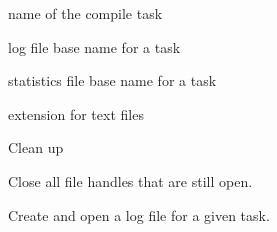 \documentclass[letterpaper,10pt,english]{sphinxmanual}
\begin{document}
\begin{fulllineitems}
\begin{fulllineitems}
\end{fulllineitems}


\begin{fulllineitems}
\label{graf/graf:graf.graf.Graf.COMPILE_TASK}
name of the compile task

\end{fulllineitems}


\begin{fulllineitems}
\label{graf/graf:graf.graf.Graf.LOG_NAME}
log file base name for a task

\end{fulllineitems}


\begin{fulllineitems}
\label{graf/graf:graf.graf.Graf.STAT_NAME}
statistics file base name for a task

\end{fulllineitems}


\begin{fulllineitems}
\label{graf/graf:graf.graf.Graf.TEXT_EXT}
extension for text files

\end{fulllineitems}


\begin{fulllineitems}
\label{graf/graf:graf.graf.Graf.__del__}
Clean up

Close all file handles that are still open.

\end{fulllineitems}


\begin{fulllineitems}
\label{graf/graf:graf.graf.Graf.add_logfile}
Create and open a log file for a given task.


\end{fulllineitems}
\end{fulllineitems}
\end{document}
